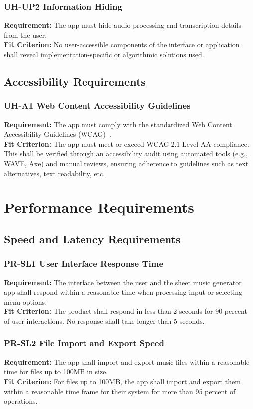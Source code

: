 \documentclass[12pt]{article}
\begin{document}
\subsubsection*{UH-UP2 Information Hiding}
\textbf{Requirement:} The app must hide audio processing and transcription details from the user.\\
\textbf{Fit Criterion:} No user-accessible components of the interface or application shall reveal
implementation-specific or algorithmic solutions used.
\subsection{Accessibility Requirements}
\subsubsection*{UH-A1 Web Content Accessibility Guidelines}
\textbf{Requirement:} The app must comply with the standardized Web Content Accessibility Guidelines (WCAG)~\cite{WCAG21}.\\
\textbf{Fit Criterion:} The app must meet or exceed WCAG 2.1 Level AA compliance. This shall be verified through 
an accessibility audit using automated tools (e.g., WAVE, Axe) and manual reviews, ensuring adherence to guidelines 
such as text alternatives, text readability, etc.
\section{Performance Requirements}
\subsection{Speed and Latency Requirements}
\subsubsection*{PR-SL1 User Interface Response Time}
\textbf{Requirement:} The interface between the user and the sheet music generator app shall respond within a reasonable time when processing input or selecting menu options.\\
\textbf{Fit Criterion:} The product shall respond in less than 2 seconds for 90 percent of user interactions. No response shall take longer than 5 seconds.
\subsubsection*{PR-SL2 File Import and Export Speed}
\textbf{Requirement:} The app shall import and export music files within a reasonable time for files up to 100MB in size.\\
\textbf{Fit Criterion:} For files up to 100MB, the app shall import and export them within a reasonable time frame for their system for more than 95 percent of operations.
\end{document}
